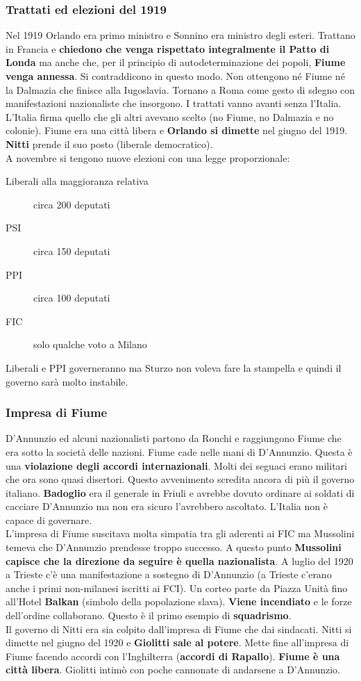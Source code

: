 \subsubsection{Trattati ed elezioni del 1919}
Nel 1919 Orlando era primo ministro e Sonnino era ministro degli esteri. Trattano in Francia e
\textbf{chiedono che venga rispettato integralmente il Patto di Londa} ma anche che, per il principio
di autodeterminazione dei popoli, \textbf{Fiume venga annessa}. Si contraddicono in questo modo.
Non ottengono né Fiume né la Dalmazia che finisce alla Iugoslavia. Tornano a Roma come gesto di 
sdegno con manifestazioni nazionaliste che insorgono. I trattati vanno avanti senza l'Italia.
L'Italia firma quello che gli altri avevano scelto (no Fiume, no Dalmazia e no colonie). Fiume era
una città libera e \textbf{Orlando si dimette} nel giugno del 1919. \textbf{Nitti} prende il suo
posto (liberale democratico).\\
A novembre si tengono nuove elezioni con una legge proporzionale:
\begin{description}
  \item[Liberali alla maggioranza relativa] circa 200 deputati
  \item[PSI] circa 150 deputati
  \item[PPI] circa 100 deputati
  \item[FIC] solo qualche voto a Milano
\end{description}
Liberali e PPI governeranno ma Sturzo non voleva fare la stampella e quindi il governo sarà molto 
instabile.

\subsubsection{Impresa di Fiume}
D'Annunzio ed alcuni nazionalisti partono da Ronchi e raggiungono Fiume che era sotto la società 
delle nazioni. Fiume cade nelle mani di D'Annunzio. Questa è una \textbf{violazione degli accordi
internazionali}. Molti dei seguaci erano militari che ora sono quasi disertori. Questo avvenimento
scredita ancora di più il governo italiano. \textbf{Badoglio} era il generale in Friuli e avrebbe
dovuto ordinare ai soldati di cacciare D'Annunzio ma non era sicuro l'avrebbero ascoltato. L'Italia
non è capace di governare.\\
L'impresa di Fiume suscitava molta simpatia tra gli aderenti ai FIC ma Mussolini temeva che 
D'Annunzio prendesse troppo successo. A questo punto \textbf{Mussolini capisce che la direzione da
seguire è quella nazionalista}. A luglio del 1920 a Trieste c'è una manifestazione a sostegno di
D'Annunzio (a Trieste c'erano anche i primi non-milanesi iscritti ai FCI). Un corteo parte da Piazza
Unità fino all'Hotel \textbf{Balkan} (simbolo della popolazione slava). \textbf{Viene incendiato} e
le forze dell'ordine collaborano. Questo è il primo esempio di \textbf{squadrismo}.\\
Il governo di Nitti era sia colpito dall'impresa di Fiume che dai sindacati. Nitti si dimette nel
giugno del 1920 e \textbf{Giolitti sale al potere}. Mette fine all'impresa di Fiume facendo accordi
con l'Inghilterra (\textbf{accordi di Rapallo}). \textbf{Fiume è una città libera}. Giolitti intimò
con poche cannonate di andarsene a D'Annunzio.

